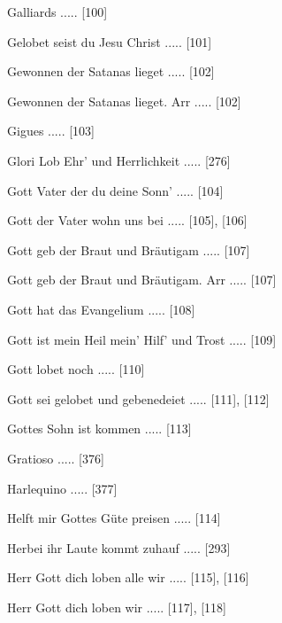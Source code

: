 \documentclass[twocolumn]{book}
\begin{document}
\newline 
Galliards ..... [100]

\newline 
Gelobet seist du Jesu Christ ..... [101]

\newline 
Gewonnen der Satanas lieget ..... [102]

\newline 
Gewonnen der Satanas lieget. Arr ..... [102]

\newline 
Gigues ..... [103]

\newline 
Glori Lob Ehr' und Herrlichkeit ..... [276]

\newline 
Gott Vater der du deine Sonn' ..... [104]

\newline 
Gott der Vater wohn uns bei ..... [105], [106]

\newline 
Gott geb der Braut und Bräutigam ..... [107]

\newline 
Gott geb der Braut und Bräutigam. Arr ..... [107]

\newline 
Gott hat das Evangelium ..... [108]

\newline 
Gott ist mein Heil mein' Hilf' und Trost ..... [109]

\newline 
Gott lobet noch ..... [110]

\newline 
Gott sei gelobet und gebenedeiet ..... [111], [112]

\newline 
Gottes Sohn ist kommen ..... [113]

\newline 
Gratioso ..... [376]

\newline 
Harlequino ..... [377]

\newline 
Helft mir Gottes Güte preisen ..... [114]

\newline 
Herbei ihr Laute kommt zuhauf ..... [293]

\newline 
Herr Gott dich loben alle wir ..... [115], [116]

\newline 
Herr Gott dich loben wir ..... [117], [118]
\end{document}
